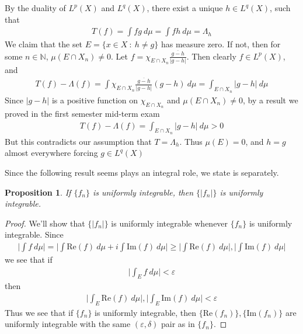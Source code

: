 \documentclass[12pt]{exam}
\theoremstyle{plain} %
\newtheorem{proposition}{Proposition}[section]
\theoremstyle{definition} %
\theoremstyle{remark} %
\begin{document}
\begin{questions}
\begin{solution}
    By the duality of $L^{p}(X)$ and $L^{q}(X)$, there exist a unique
    $h \in L^{q}(X)$, such that
    \begin{align*}
      T(f) = \int fg \ d \mu =  \int fh \ d \mu = \Lambda_h
    \end{align*}
    We claim that the set $E = \{ x \in X \ : \ h \neq g \}$ has
    measure zero. If not, then for some $n \in \mathbb{N}$, $\mu(E
    \cap X_n) \neq 0$. Let $f = \chi_{E \cap X_n} \frac{\overline{g -
    h}}{|g - h|}$. Then clearly $f \in L^{p}(X)$, and
    \begin{align*}
      T(f) - \Lambda(f) = \int \chi_{E \cap X_n} \frac{\overline{g -
      h}}{|g - h|} (g - h) \ d \mu = \int_{E \cap X_n} |g - h| \ d \mu
    \end{align*}
    Since $|g - h|$ is a positive function on $\chi_{E \cap X_n}$ and
    $\mu(E \cap X_n) \neq 0$, by a result we proved in the first
    semester mid-term exam
    \begin{align*}
      T(f) - \Lambda(f) = \int_{E \cap X_n} |g - h| \ d \mu > 0
    \end{align*}
    But this contradicts our assumption that $T = \Lambda_h$. Thus
    $\mu(E) = 0$, and $  h = g$ almost everywhere forcing $g \in L^{q}(X)$
  \end{solution}

  \question
  \begin{solution}
    Since the following result seems plays an integral role, we state
    is separately.
    \begin{proposition}
      If $\{ f_n \}$ is uniformly integrable, then $ \{ |f_n| \}$ is
      uniformly integrable.
    \end{proposition}
    \begin{proof}

      We'll show that $\{|f_n|\}$ is uniformly integrable whenever $\{
      f_n \}$ is uniformly integrable. Since
      \begin{align*}
        \Bigg| \int f \ d \mu \Bigg| = \Bigg| \int \textrm{Re}(f) \ d
        \mu + i \int
        \textrm{Im}(f) \ d \mu \Bigg| \ge \Bigg| \int \textrm{Re}(f)
        \ d \mu \Bigg| , \Bigg| \int  \textrm{Im}(f) \ d \mu \Bigg|
      \end{align*}
      we see that if
      \begin{align*}
        \Bigg| \int_E f \ d \mu \Bigg| < \varepsilon
      \end{align*}
      then
      \begin{align*}
        \Bigg| \int_E \textrm{Re}(f) \ d \mu \Bigg|, \Bigg| \int_E
        \textrm{Im}(f) \ d \mu  \Bigg| < \varepsilon
      \end{align*}
      Thus we see that if $\{f_n\}$ is uniformly integrable, then $\{
      \textrm{Re}(f_n) \}, \{  \textrm{Im}(f_n) \}$ are uniformly
      integrable with the same $(\varepsilon,\delta)$ pair as in $\{ f_n \}$.


\end{proof}
\end{solution}
\end{questions}
\end{document}
